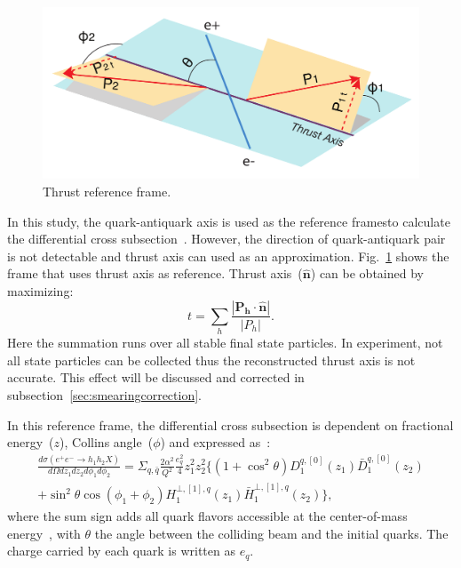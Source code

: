 \begin{figure}[H]
  \centering     
  \includegraphics[width=.9\textwidth,natwidth=600,natheight=400]{figure_theory/e+e-_phi1phi2.pdf}
  \caption{Thrust reference frame.}
  \label{fig:phi1phi2frame}
\end{figure}

In this study, the quark-antiquark axis is used as the reference framesto calculate the differential cross subsection~\cite{BoerThesis}. However, the direction of quark-antiquark pair is not detectable and thrust axis can used as an approximation. Fig.~\ref{fig:phi1phi2frame} shows the frame that uses thrust axis as reference. Thrust axis~($\boldsymbol{\hat{n}}$) can be obtained by  maximizing:
\begin{equation}
t=\sum_h\frac{|\boldsymbol{P_h\cdot\hat{n}}|}{|P_h|}.
\end{equation}
Here the summation runs over all stable final state particles. In experiment, not all state particles can be collected thus the reconstructed thrust axis is not accurate. This effect will be discussed and corrected in subsection~\ref{sec:smearingcorrection}. 

In this reference frame, the differential cross subsection is dependent on fractional energy~($z$), Collins angle~($\phi$) and expressed as~\cite{BoerThesis}:
\begin{equation}
\begin{aligned}
\frac{d\sigma(e^+e^-\rightarrow h_1h_2X)}{d\Omega dz_1dz_2 d\phi_1d\phi_2}=\Sigma_{q,\bar{q}} \frac{2\alpha^2}{Q^2}\frac{e_q^2}{4}z^2_1z^2_2\{ (1+\cos^2\theta)D_1^{q,[0]}(z_1)\bar{D}_1^{q,[0]}(z_2) \\
+\sin^2\theta\cos(\phi_1+\phi_2)H_1^{\bot,[1],q}(z_1)\bar{H}_1^{\bot,[1],q}(z_2)\},
\end{aligned}
\label{eqn:cross_subsection_ee}
\end{equation}
where the sum sign adds all quark flavors accessible at the center-of-mass energy~\cite{BoerThesis},  with $\theta$ the angle between the colliding beam and the initial quarks. The charge carried by each quark is written as $e_q$.

